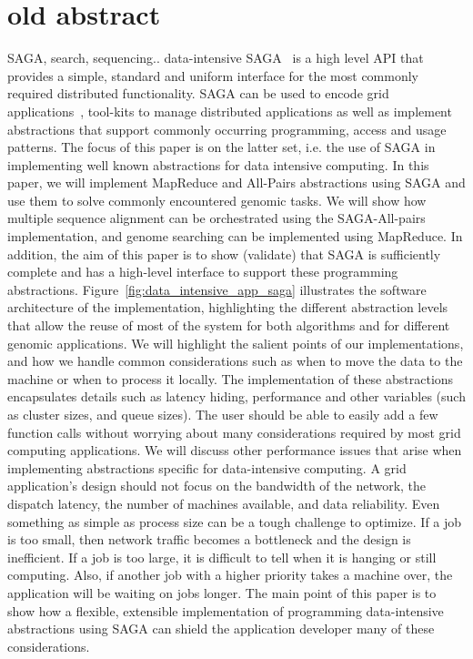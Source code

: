 \documentclass[conference,final]{IEEEtran}
\begin{document}
\section{old abstract} 
SAGA, search, sequencing.. data-intensive SAGA~\cite{saga_gfd90} is a
high level API that provides a simple, standard and uniform interface
for the most commonly required distributed functionality.  SAGA can be
used to encode grid applications~\cite{saga_escience07, saga_tg08},
tool-kits to manage distributed applications as well as implement
abstractions that support commonly occurring programming, access and
usage patterns.  The focus of this paper is on the latter set, i.e.
the use of SAGA in implementing well known abstractions for data
intensive computing.  In this paper, we will implement MapReduce and
All-Pairs abstractions using SAGA and use them to solve commonly
encountered genomic tasks.  We will show how multiple sequence
alignment can be orchestrated using the SAGA-All-pairs implementation,
and genome searching can be implemented using MapReduce.  In addition,
the aim of this paper is to show (validate) that SAGA is sufficiently
complete and has a high-level interface to support these programming
abstractions.  Figure~\ref{fig:data_intensive_app_saga} illustrates
the software architecture of the implementation, highlighting the
different abstraction levels that allow the reuse of most of the
system for both algorithms and for different genomic applications.  We
will highlight the salient points of our implementations, and how we
handle common considerations such as when to move the data to the
machine or when to process it locally.  The implementation of these
abstractions encapsulates details such as latency hiding, performance
and other variables (such as cluster sizes, and queue sizes).  The
user should be able to easily add a few function calls without
worrying about many considerations required by most grid computing
applications.  We will discuss other performance issues that arise
when implementing abstractions specific for data-intensive computing.
A grid application's design should not focus on the bandwidth of the
network, the dispatch latency, the number of machines available, and
data reliability.  Even something as simple as process size can be a
tough challenge to optimize.  If a job is too small, then network
traffic becomes a bottleneck and the design is inefficient.  If a job
is too large, it is difficult to tell when it is hanging or still
computing.  Also, if another job with a higher priority takes a
machine over, the application will be waiting on jobs longer.  The
main point of this paper is to show how a flexible, extensible
implementation of programming data-intensive abstractions using SAGA
can shield the application developer many of these considerations.
\end{document}
